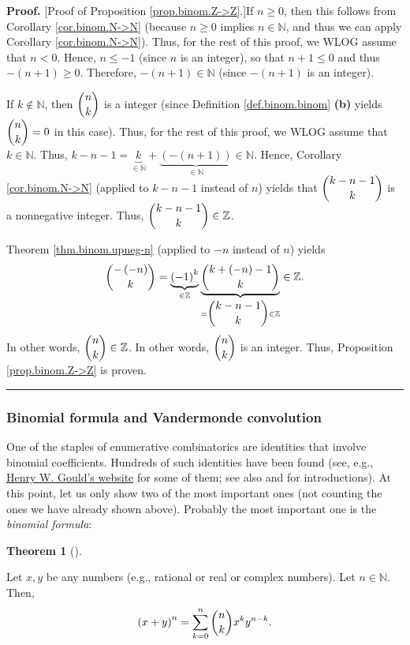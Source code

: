 \documentclass[numbers=enddot,12pt,final,onecolumn,notitlepage]{scrartcl}%
\numberwithin{exer}{subsection}
\theoremstyle{definition}
\newtheorem{theo}{Theorem}[subsection]
\newenvironment{theorem}[1][]
{\begin{theo}[#1]\begin{leftbar}}
{\end{leftbar}\end{theo}}
\newenvironment{proof}[1][Proof]{\noindent\textbf{#1.} }{\ \rule{0.5em}{0.5em}}
\let\sumnonlimits\sum
\renewcommand{\sum}{\sumnonlimits\limits}
\begin{document}
\begin{proof}
[Proof of Proposition \ref{prop.binom.Z->Z}.]If $n\geq0$, then this follows
from Corollary \ref{cor.binom.N->N} (because $n\geq0$ implies $n\in\mathbb{N}%
$, and thus we can apply Corollary \ref{cor.binom.N->N}). Thus, for the rest
of this proof, we WLOG assume that $n<0$. Hence, $n\leq-1$ (since $n$ is an
integer), so that $n+1\leq0$ and thus $-\left(  n+1\right)  \geq0$. Therefore,
$-\left(  n+1\right)  \in\mathbb{N}$ (since $-\left(  n+1\right)  $ is an integer).

If $k\notin\mathbb{N}$, then $\dbinom{n}{k}$ is a integer (since Definition
\ref{def.binom.binom} \textbf{(b)} yields $\dbinom{n}{k}=0$ in this case).
Thus, for the rest of this proof, we WLOG assume that $k\in\mathbb{N}$. Thus,
$k-n-1=\underbrace{k}_{\in\mathbb{N}}+\underbrace{\left(  -\left(  n+1\right)
\right)  }_{\in\mathbb{N}}\in\mathbb{N}$. Hence, Corollary
\ref{cor.binom.N->N} (applied to $k-n-1$ instead of $n$) yields that
$\dbinom{k-n-1}{k}$ is a nonnegative integer. Thus, $\dbinom{k-n-1}{k}%
\in\mathbb{Z}$.

Theorem \ref{thm.binom.upneg-n} (applied to $-n$ instead of $n$) yields%
\[
\dbinom{-\left(  -n\right)  }{k}=\underbrace{\left(  -1\right)  ^{k}}%
_{\in\mathbb{Z}}\underbrace{\dbinom{k+\left(  -n\right)  -1}{k}}%
_{=\dbinom{k-n-1}{k}\in\mathbb{Z}}\in\mathbb{Z}.
\]
In other words, $\dbinom{n}{k}\in\mathbb{Z}$. In other words, $\dbinom{n}{k}$
is an integer. Thus, Proposition \ref{prop.binom.Z->Z} is proven.
\end{proof}

\subsubsection{Binomial formula and Vandermonde convolution}

One of the staples of enumerative combinatorics are identities that involve
binomial coefficients. Hundreds of such identities have been found (see, e.g.,
\href{http://www.math.wvu.edu/~gould/}{Henry W. Gould's website} for some of
them; see also \cite[Chapter 5]{GKP} and \cite[Chapter 3]{detnotes} for
introductions). At this point, let us only show two of the most important ones
(not counting the ones we have already shown above). Probably the most
important one is the \textit{binomial formula}:

\begin{theorem}
\label{thm.binom.binf}Let $x,y$ be any numbers (e.g., rational or real or
complex numbers). Let $n\in\mathbb{N}$. Then,%
\[
\left(  x+y\right)  ^{n}=\sum_{k=0}^{n}\dbinom{n}{k}x^{k}y^{n-k}.
\]

\end{theorem}
\end{document}
